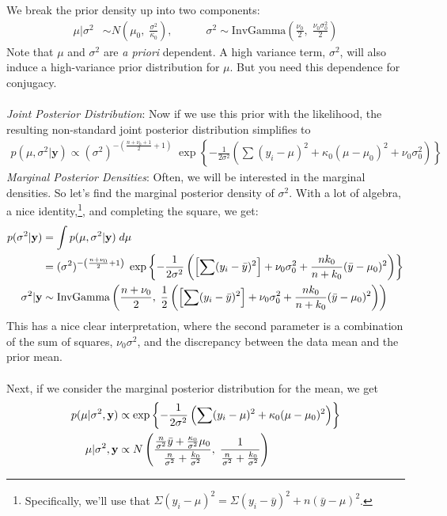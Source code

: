 \documentclass[a4paper,12pt]{scrartcl}
\begin{document}
We break the prior density up into two components:
\begin{align*}
   \mu|\sigma^2 &\sim N\left(\mu_0, \; \frac{\sigma^2}{\kappa_0}
   \right), \qquad \quad
   \sigma^2 \sim \text{InvGamma}\left(\frac{\nu_0}{2},
   \; \frac{\nu_0\sigma^2_0}{2}\right)
\end{align*}
Note that $\mu$ and $\sigma^2$ are \emph{a priori} dependent. A high
variance term, $\sigma^2$, will also induce a high-variance prior
distribution for $\mu$. But you need this dependence for conjugacy.
\\
\\
{\sl Joint Posterior Distribution}:
Now if we use this prior with the likelihood, the resulting non-standard
joint posterior distribution simplifies to
\begin{align*}
   p(\mu, \sigma^2 | \mathbf{y}) \propto (\sigma^2)^{- \left(\frac{
   n+\nu_0+1}{2} + 1\right)} \; \exp \left\{ -\frac{1}{2\sigma^2}
   \left( \sum (y_i-\mu)^2 + \kappa_0 (\mu - \mu_0)^2 + \nu_0\sigma_0^2
   \right) \right\}
\end{align*}
{\sl Marginal Posterior Densities}:
Often, we will be interested in the marginal densities. So let's find
the marginal posterior density of $\sigma^2$. With a lot of algebra, 
a nice identity,\footnote{Specifically, we'll use that $\Sigma 
   (y_i - \mu)^2 = \Sigma  (y_i - \bar{y})^2 + n(\bar{y}-\mu)^2$.}, 
and completing the square, we get:
\begin{align}
   \label{sigpos}
   p(\sigma^2|\mathbf{y})&=\int p(\mu, \sigma^2 | \mathbf{y}) \; d\mu
   \notag\\
   &= (\sigma^2)^{-\left(\frac{n+\nu_0}{2}+1\right)} \;
   \exp\left\{ -\frac{1}{2\sigma^2} \left( \left[\sum (y_i-\bar{y})^2
   \right] +\nu_0 \sigma^2_0 + \frac{nk_0}{n + k_0} (\bar{y}-\mu_0)^2
   \right) \right\}\notag\\
   \sigma^2|\mathbf{y} &\sim \text{InvGamma}\left(\frac{n+\nu_0}{2},
   \; \frac{1}{2} \left(\left[\sum (y_i-\bar{y})^2
   \right] +\nu_0 \sigma^2_0 + \frac{nk_0}{n + k_0} (\bar{y}-\mu_0)^2
   \right)\right) 
\end{align}
This has a nice clear interpretation, where the second parameter is a
combination of the sum of squares, $\nu_0\sigma^2$, and the discrepancy
between the data mean and the prior mean. 
\\
\\
Next, if we consider the
marginal posterior distribution for the mean, we get
\begin{align}
   \label{mupos}
   p(\mu | \sigma^2,\mathbf{y}) &\propto \exp\left\{ -\frac{1}{2\sigma^2}
   \left( \sum (y_i - \mu)^2 + \kappa_0 (\mu-\mu_0)^2\right)\right\}
   \notag\\
   \mu | \sigma^2,\mathbf{y} &\propto N\left( \frac{\frac{n}{\sigma^2}
   \bar{y} + \frac{\kappa_0}{\sigma^2}\mu_0}{\frac{n}{\sigma^2} +
   \frac{k_0}{\sigma^2}}, \; \frac{1}{\frac{n}{\sigma^2} +
   \frac{k_0}{\sigma^2}}\right)
\end{align}
\end{document}
